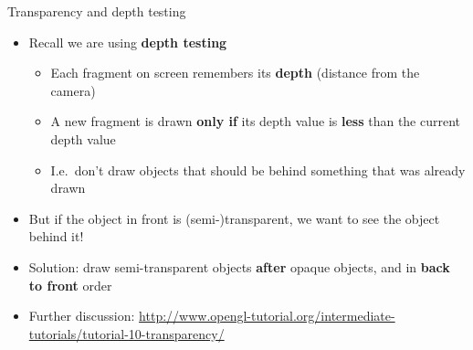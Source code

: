 \begin{frame}{Transparency and depth testing}
	\begin{itemize}
		\item Recall we are using \textbf{depth testing}
			\begin{itemize}
				\pause\item Each fragment on screen remembers its \textbf{depth} (distance from the camera)
				\pause\item A new fragment is drawn \textbf{only if} its depth value is \textbf{less} than the current depth value
				\pause\item I.e.\ don't draw objects that should be behind something that was already drawn
			\end{itemize}
		\pause\item But if the object in front is (semi-)transparent, we want to see the object behind it!
		\pause\item Solution: draw semi-transparent objects \textbf{after} opaque objects,
			and in \textbf{back to front} order
		\pause\item Further discussion: {\footnotesize\url{http://www.opengl-tutorial.org/intermediate-tutorials/tutorial-10-transparency/}}
	\end{itemize}
\end{frame}
